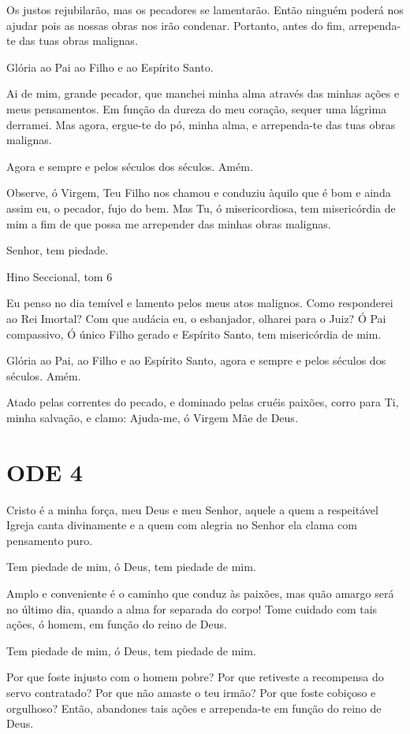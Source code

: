 \documentclass{subfiles}
\begin{document}
Os justos rejubilarão, mas os pecadores se lamentarão. Então ninguém poderá nos
ajudar pois as nossas obras nos irão condenar. Portanto, antes do fim,
arrependa-te das tuas obras malignas.

Glória ao Pai ao Filho e ao Espírito Santo.

Ai de mim, grande pecador, que manchei minha alma através das minhas ações e
meus pensamentos. Em função da dureza do meu coração, sequer uma lágrima
derramei. Mas agora, ergue-te do pó, minha alma, e arrependa-te das tuas obras
malignas.

Agora e sempre e pelos séculos dos séculos. Amém.

\theotokion{}Observe, ó Virgem, Teu Filho nos chamou e conduziu àquilo que é bom
e ainda assim eu, o pecador, fujo do bem. Mas Tu, ó misericordiosa, tem
misericórdia de mim a fim de que possa me arrepender das minhas obras malignas.

Senhor, tem piedade. 

Hino Seccional, tom 6

Eu penso no dia temível e lamento pelos meus atos malignos. Como responderei ao
Rei Imortal? Com que audácia eu, o esbanjador, olharei para o Juiz? Ó Pai
compassivo, Ó único Filho gerado e Espírito Santo, tem misericórdia de mim.

Glória ao Pai, ao Filho e ao Espírito Santo, agora e sempre e pelos séculos dos
séculos. Amém.

\theotokion{}Atado pelas correntes do pecado, e dominado pelas cruéis paixões,
corro para Ti, minha salvação, e clamo: Ajuda-me, ó Virgem Mãe de Deus.

\section*{ODE 4}

\eirmos{}Cristo é a minha força, meu Deus e meu Senhor, aquele a quem a
respeitável Igreja canta divinamente e a quem com alegria no Senhor ela clama
com pensamento puro.

Tem piedade de mim, ó Deus, tem piedade de mim.

Amplo e conveniente é o caminho que conduz às paixões, mas quão amargo será no
último dia, quando a alma for separada do corpo! Tome cuidado com tais ações, ó
homem, em função do reino de Deus.

Tem piedade de mim, ó Deus, tem piedade de mim.

Por que foste injusto com o homem pobre? Por que retiveste a recompensa do servo
contratado? Por que não amaste o teu irmão? Por que foste cobiçoso e orgulhoso?
Então, abandones tais ações e arrependa-te em função do reino de Deus.
\end{document}
